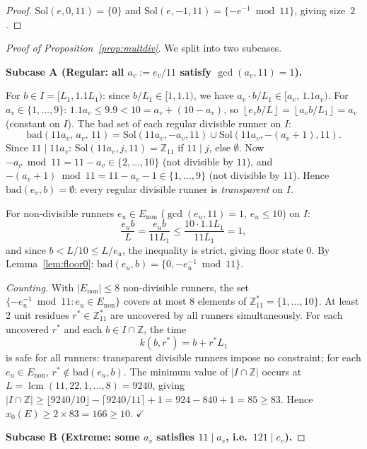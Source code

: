 \documentclass[11pt]{article}
\theoremstyle{definition}
\newcommand{\Enon}{E_{\mathrm{non}}}
\newcommand{\Zstar}{\mathbb{Z}_{11}^{*}}
\newcommand{\bad}{\mathrm{bad}}
\newcommand{\Sol}{\mathrm{Sol}}
\newcommand{\lcm}{\operatorname{lcm}}
\newcommand{\floor}[1]{\left\lfloor #1 \right\rfloor}
\begin{document}
\begin{proof}
  $\Sol(e, 0, 11) = \{0\}$ and $\Sol(e, -1, 11) = \{-e^{-1} \bmod 11\}$,
  giving size~$2$.
\end{proof}

\begin{proof}[Proof of Proposition~\ref{prop:multdiv}]
  We split into two subcases.

  \medskip
  \noindent\textbf{Subcase A (Regular: all $a_v := e_v/11$ satisfy
  $\gcd(a_v,11)=1$).}

  For $b \in I = [L_1, 1.1L_1)$: since $b/L_1 \in [1, 1.1)$, we have
  $a_v \cdot b/L_1 \in [a_v,\, 1.1a_v)$.
  For $a_v \in \{1,\ldots,9\}$: $1.1 a_v \leq 9.9 < 10 = a_v + (10 - a_v)$,
  so $\floor{e_v b/L} = \floor{a_v b/L_1} = a_v$ (constant on $I$).
  The bad set of each regular divisible runner on $I$:
  \[
    \bad(11a_v,\, a_v,\, 11) = \Sol(11a_v, -a_v, 11) \cup
    \Sol(11a_v, -(a_v{+}1), 11).
  \]
  Since $11 \mid 11a_v$: $\Sol(11a_v, j, 11) = \mathbb{Z}_{11}$ if
  $11 \mid j$, else $\emptyset$.
  Now $-a_v \bmod 11 = 11 - a_v \in \{2,\ldots,10\}$ (not divisible by
  $11$), and $-(a_v{+}1) \bmod 11 = 11 - a_v - 1 \in \{1,\ldots,9\}$
  (not divisible by $11$).
  Hence $\bad(e_v, b) = \emptyset$: every regular divisible runner is
  \emph{transparent} on $I$.

  For non-divisible runners $e_u \in \Enon$ ($\gcd(e_u,11)=1$,
  $e_u \leq 10$) on $I$:
  \[
    \frac{e_u b}{L} = \frac{e_u b}{11 L_1} \leq \frac{10 \cdot 1.1 L_1}{11 L_1}
    = 1,
  \]
  and since $b < L/10 \leq L/e_u$, the inequality is strict, giving
  floor state $0$.
  By Lemma~\ref{lem:floor0}: $\bad(e_u, b) = \{0, -e_u^{-1} \bmod 11\}$.

  \textit{Counting.}
  With $|\Enon| \leq 8$ non-divisible runners, the set
  $\{-e_u^{-1} \bmod 11 : e_u \in \Enon\}$ covers at most $8$ elements of
  $\Zstar = \{1,\ldots,10\}$.
  At least $2$ unit residues $r^* \in \Zstar$ are uncovered by all
  runners simultaneously.
  For each uncovered $r^*$ and each $b \in I \cap \mathbb{Z}$, the time
  \[
    k(b, r^*) = b + r^* L_1
  \]
  is safe for all runners: transparent divisible runners impose no
  constraint; for each $e_u \in \Enon$, $r^* \notin \bad(e_u, b)$.
  The minimum value of $|I \cap \mathbb{Z}|$ occurs at $L = \lcm(11, 22,
  1,\ldots,8) = 9240$, giving $|I \cap \mathbb{Z}| \geq
  \lfloor 9240/10 \rfloor - \lceil 9240/11 \rceil + 1 = 924 - 840 + 1
  = 85 \geq 83$.
  Hence $x_0(E) \geq 2 \times 83 = 166 \geq 10$. $\checkmark$

  \medskip
  \noindent\textbf{Subcase B (Extreme: some $a_v$ satisfies
  $11 \mid a_v$, i.e.\ $121 \mid e_v$).}


\end{proof}
\end{document}
